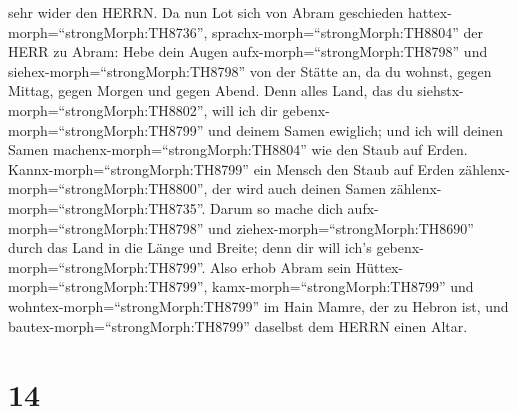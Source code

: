 sehr wider den HERRN.  Da nun Lot sich von Abram geschieden
hattex-morph=``strongMorph:TH8736'',
sprachx-morph=``strongMorph:TH8804'' der HERR zu Abram: Hebe dein Augen
aufx-morph=``strongMorph:TH8798'' und
siehex-morph=``strongMorph:TH8798'' von der Stätte an, da du wohnst,
gegen Mittag, gegen Morgen und gegen Abend.  Denn alles
Land, das du siehstx-morph=``strongMorph:TH8802'', will ich dir
gebenx-morph=``strongMorph:TH8799'' und deinem Samen ewiglich;
 und ich will deinen Samen
machenx-morph=``strongMorph:TH8804'' wie den Staub auf Erden.
Kannx-morph=``strongMorph:TH8799'' ein Mensch den Staub auf Erden
zählenx-morph=``strongMorph:TH8800'', der wird auch deinen Samen
zählenx-morph=``strongMorph:TH8735''.  Darum so mache dich
aufx-morph=``strongMorph:TH8798'' und
ziehex-morph=``strongMorph:TH8690'' durch das Land in die Länge und
Breite; denn dir will ich's gebenx-morph=``strongMorph:TH8799''.
 Also erhob Abram sein Hüttex-morph=``strongMorph:TH8799'',
kamx-morph=``strongMorph:TH8799'' und
wohntex-morph=``strongMorph:TH8799'' im Hain Mamre, der zu Hebron ist,
und bautex-morph=``strongMorph:TH8799'' daselbst dem HERRN einen Altar.

\hypertarget{section-13}{%
\section{14}\label{section-13}}

